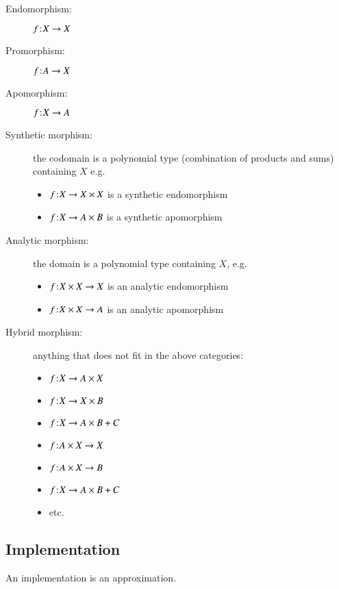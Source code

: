 \begin{description}
\item[Endomorphism\footnotemark:] \(f\hspace{1pt}\mathpunct{:}\hspace{-1pt}X\rightarrow X\)
\item[Promorphism\footnotemark:] \(f\hspace{1pt}\mathpunct{:}\hspace{-1pt}A\rightarrow X\)
\item[Apomorphism\footnotemark:] \(f\hspace{1pt}\mathpunct{:}\hspace{-1pt}X\rightarrow A\)
\item[Synthetic morphism:] the codomain is a polynomial type
  (combination of products and sums) containing \(X\) e.g.
  \begin{itemize}
  \item \(f\hspace{1pt}\mathpunct{:}\hspace{-1pt}X\rightarrow X\times X\) is a synthetic endomorphism
  \item \(f\hspace{1pt}\mathpunct{:}\hspace{-1pt}X\rightarrow A\times B\) is a synthetic apomorphism
  \end{itemize}
\item[Analytic morphism:] the domain is a polynomial type containing \(X\), e.g.
  \begin{itemize}
    \item \(f\hspace{1pt}\mathpunct{:}\hspace{-1pt}X\times X\rightarrow X\) is an analytic endomorphism
    \item \(f\hspace{1pt}\mathpunct{:}\hspace{-1pt}X\times X\rightarrow A\) is an analytic apomorphism
  \end{itemize}
\item[Hybrid morphism:] anything that does not fit in the above categories:
  \begin{itemize}
  \item \(f\hspace{1pt}\mathpunct{:}\hspace{-1pt}X\rightarrow A\times X\)
  \item \(f\hspace{1pt}\mathpunct{:}\hspace{-1pt}X\rightarrow X\times B\)
  \item \(f\hspace{1pt}\mathpunct{:}\hspace{-1pt}X\rightarrow A\times B + C\)
  \item \(f\hspace{1pt}\mathpunct{:}\hspace{-1pt}A\times X\rightarrow X\)
  \item \(f\hspace{1pt}\mathpunct{:}\hspace{-1pt}A\times X\rightarrow B\)
  \item \(f\hspace{1pt}\mathpunct{:}\hspace{-1pt}X\rightarrow A\times B + C\)
  \item etc.
  \end{itemize}
\end{description}


\subsection{Implementation}

An implementation is an approximation.

